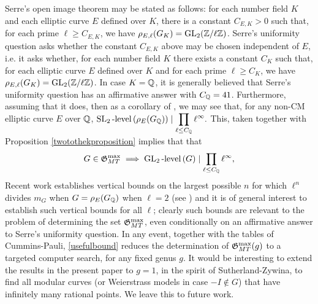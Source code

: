 
Serre's open image theorem may be stated as follows: for each number field $K$ and each elliptic curve $E$ defined over $K$, there is a constant $C_{E,K} > 0$ such that, for each prime $\ell \geq C_{E,K}$, we have $\rho_{E,\ell}(G_K) = \operatorname{GL}_2(\mathbb{Z}/\ell\mathbb{Z})$.  Serre's uniformity question asks whether the constant $C_{E,K}$ above may be chosen independent of $E$, i.e. it asks whether, for each number field $K$ there exists a constant $C_K$ such that, for each elliptic curve $E$ defined over $K$ and for each prime $\ell \geq C_K$, we have $\rho_{E,\ell}(G_K) = \operatorname{GL}_2(\mathbb{Z}/\ell\mathbb{Z})$.  In case $K = \mathbb{Q}$, it is generally believed that Serre's uniformity question has an affirmative answer with $C_{\mathbb{Q}} = 41$.  Furthermore, assuming that it does, then as a corollary of \cite[Lemma 4.10]{jonesconductorbound}, we may see that, for any non-CM elliptic curve $E$ over $\mathbb{Q}$,
$
\displaystyle \operatorname{SL}_2\text{-level}\left( \rho_E(G_{\mathbb{Q}}) \right) \mid \prod_{\ell \leq C_{\mathbb{Q}}} \ell^\infty.
$
This, taken together with Proposition \ref{twotothekproposition} implies that that
\begin{equation} \label{usefulbound}
G \in \mathfrak{G}_{MT}^{\max} \; \Longrightarrow \; \operatorname{GL}_2\text{-level}\left( G \right) \mid \prod_{\ell \leq C_{\mathbb{Q}}} \ell^\infty,
\end{equation}
Recent work establishes vertical bounds on the largest possible $n$ for which $\ell^n$ divides $m_G$ when $G = \rho_{E}(G_{\mathbb{Q}})$ when $\ell = 2$ (see \cite{rousedzb}) and it is of general interest to establish such vertical bounds for all $\ell$; clearly such bounds are relevant to the problem of determining the set $\mathfrak{G}_{MT}^{\max}$, even conditionally on an affirmative answer to Serre's uniformity question.  In any event, together with the tables of Cummins-Pauli, \eqref{usefulbound} reduces the determination of $\mathfrak{G}_{MT}^{\max}(g)$ to a targeted computer search, for any fixed genus $g$.
It would be interesting to extend the results in the present paper to $g = 1$, in the spirit of Sutherland-Zywina, to find all modular curves (or Weierstrass models in case $-I \notin G$) that have infinitely many rational points.  We leave this to future work.
